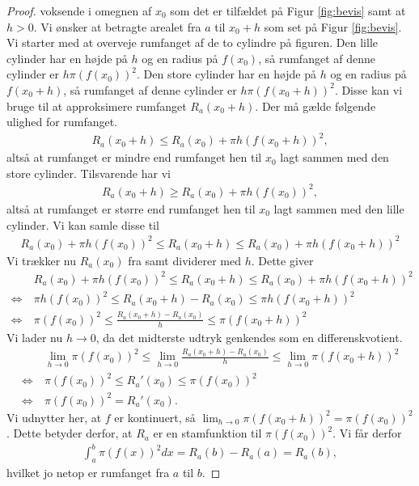 \begin{proof}
	 voksende i omegnen af $x_0$ som det er tilfældet på Figur \ref{fig:bevis} samt at $h > 0$. 
	  Vi ønsker at betragte arealet fra $a$ til $x_0 + h$ 
	 som set på Figur \ref{fig:bevis}. Vi starter med at overveje rumfanget af de to cylindre på figuren. 
	 Den lille cylinder har en højde på $h$ og en radius på $f(x_0)$, så rumfanget af denne cylinder er 
	 $h \pi (f(x_0))^2$. 
	 Den store cylinder har en højde på $h$ og en radius på $f(x_0 + h)$, så rumfanget af denne cylinder er 
	 $h \pi (f(x_0 + h))^2$. Disse kan vi bruge til at approksimere rumfanget $R_a(x_0+h)$. Der må gælde følgende
	 ulighed	 for rumfanget.
	 \begin{align*}
	 	R_a(x_0 + h) \leq R_a(x_0) +  \pi h (f(x_0 + h))^2,
	\end{align*}	  
	altså at rumfanget er mindre end rumfanget hen til $x_0$ lagt sammen med den store cylinder. Tilsvarende har vi
	\begin{align*}
		R_a(x_0 + h) \geq R_a(x_0) +  \pi h (f(x_0))^2, 
	\end{align*}
	altså at rumfanget er større end rumfanget hen til $x_0$ lagt sammen med den lille cylinder. Vi kan samle disse til
	\begin{align*}
		R_a(x_0) + \pi h (f(x_0))^2 \leq R_a(x_0 + h) \leq R_a(x_0) + \pi h (f(x_0 + h))^2
	\end{align*}
	Vi trækker nu $R_a(x_0)$ fra samt dividerer med $h$. Dette giver
	\begin{align*}
		&R_a(x_0) + \pi h (f(x_0))^2 \leq R_a(x_0 + h) \leq R_a(x_0) + \pi h (f(x_0 + h))^2 \\
		\Leftrightarrow \ &\pi h (f(x_0))^2 \leq R_a(x_0 + h) - R_a(x_0) \leq \pi h (f(x_0 + h))^2 \\
		\Leftrightarrow \ &\pi(f(x_0))^2 \leq \frac{R_a(x_0 + h) - R_a(x_0)}{h} \leq \pi(f(x_0 + h))^2
	\end{align*}
	Vi lader nu $h \to 0$, da det midterste udtryk genkendes som en differenskvotient.
	\begin{align*}
		&\lim_{h \to 0}\pi(f(x_0))^2 \leq \lim_{h \to 0}\frac{R_a(x_0 + h) - R_a(x_0)}{h} \leq
		 \lim_{h \to 0}\pi(f(x_0 + h))^2 \\
		 \Leftrightarrow \ & \pi (f(x_0))^2 \leq R_a'(x_0) \leq \pi (f(x_0))^2 \\
		 \Leftrightarrow \ & \pi (f(x_0))^2 = R_a'(x_0).
	\end{align*}
	Vi udnytter her, at $f$ er kontinuert, så $\displaystyle \lim_{h\to 0} \pi (f(x_0 + h))^2 = \pi (f(x_0))^2$.
	Dette betyder derfor, at $R_a$ er en stamfunktion til $\pi (f(x_0))^2$. Vi får derfor
	\begin{align*}
		\int_a^b \pi (f(x))^2 dx = R_a(b) - R_a(a) = R_a(b),
	\end{align*}
	hvilket jo netop er rumfanget fra $a$ til $b$. 
\end{proof}

